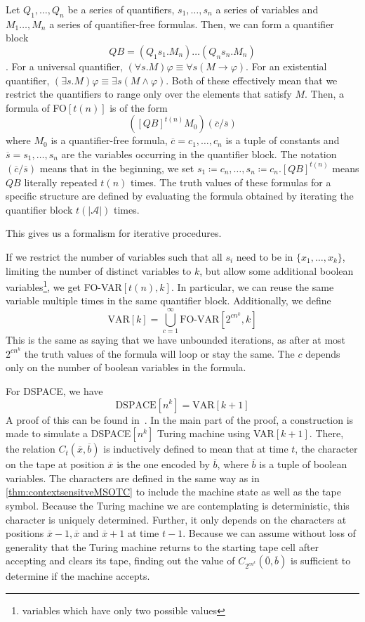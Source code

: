 \begin{define}[{FO$[t(n)]$}]
    Let $Q_1, \dots, Q_n$ be a series of quantifiers, $s_1, \dots, s_n$ a series of variables and $M_1 \dots, M_n$ a series of quantifier-free formulas.
    Then, we can form a quantifier block \[QB = (Q_{1}s_{1}.M_{n})\dots(Q_{n}s_{n}.M_{n})\].
    For a universal quantifier, $(\forall s.M)\varphi \equiv \forall s (M \to \varphi)$.
    For an existential quantifier, $(\exists s.M)\varphi \equiv \exists s(M \land \varphi)$.
    Both of these effectively mean that we restrict the quantifiers to range only over the elements that satisfy $M$.
    Then, a formula of FO$[t(n)]$ is of the form
    \[
        \left([QB]^{t(n)}M_{0}\right)(\overline{c} / \overline{s})
    \]
    where $M_0$ is a quantifier-free formula, $\overline{c} = c_1, \dots, c_n$ is a tuple of constants and $\overline{s} = s_1, \dots, s_n$ are the variables occurring in the quantifier block.
    The notation $(\overline{c} / \overline{s})$ means that in the beginning, we set $s_1 \coloneqq c_n, \dots, s_n \coloneqq c_n$.$[QB]^{t(n)}$ means $QB$ literally repeated $t(n)$ times.
    The truth values of these formulas for a specific structure are defined by evaluating the formula obtained by iterating the quantifier block $t(|\mathcal{A}|)$ times.
\end{define}
This gives us a formalism for iterative procedures.

If we restrict the number of variables such that all $s_i$ need to be in $\{x_1, \dots, x_k \}$, limiting the number of distinct variables to $k$, but allow some additional boolean variables\footnote{variables which have only two possible values}, we get FO-VAR$[t(n), k]$.
In particular, we can reuse the same variable multiple times in the same quantifier block.
Additionally, we define
\[
    \text{VAR}[k] = \bigcup_{c = 1}^{\infty}\text{FO-VAR}[2^{cn^k}, k]
\]
This is the same as saying that we have unbounded iterations, as after at most $2^{cn^k}$ the truth values of the formula will loop or stay the same.
The $c$ depends only on the number of boolean variables in the formula.

For DSPACE, we have
\[
    \text{DSPACE}[n^k] = \text{VAR}[k + 1]
\]
A proof of this can be found in~\cite{descriptive-complexity}.
In the main part of the proof, a construction is made to simulate a DSPACE$[n^k]$ Turing machine using VAR$[k + 1]$.
There, the relation $C_{t}(\overline{x}, \overline{b})$ is inductively defined to mean that at time $t$, the character on the tape at position $\overline{x}$ is the one encoded by $\overline{b}$, where $\overline{b}$ is a tuple of boolean variables.
The characters are defined in the same way as in \cref{thm:contextsensitveMSOTC} to include the machine state as well as the tape symbol.
Because the Turing machine we are contemplating is deterministic, this character is uniquely determined.
Further, it only depends on the characters at positions $\overline{x} - 1, \overline{x}$ and $\overline{x} + 1$ at time $t - 1$.
Because we can assume without loss of generality that the Turing machine returns to the starting tape cell after accepting and clears its tape, finding out the value of $C_{2^{cn^k}}(\overline{0}, \overline{b})$ is sufficient to determine if the machine accepts.

